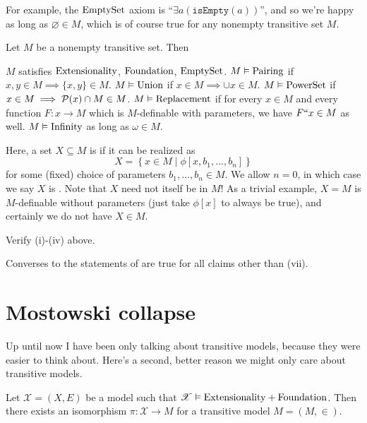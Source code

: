 For example, the $\mathrm{EmptySet}$ axiom is ``$\exists a (\mathtt{isEmpty}(a))$'',
and so we're happy as long as $\varnothing \in M$, which is of course
true for any nonempty transitive set $M$.

\begin{lemma}
	\label{lem:transitive_ZFC}
	Let $M$ be a nonempty transitive set. Then
	\begin{enumerate}[(i)]
		\ii $M$ satisfies $\mathrm{Extensionality}$, $\mathrm{Foundation}$, $\mathrm{EmptySet}$.
		\ii $M \vDash \mathrm{Pairing}$ if $x,y \in M \implies \{x,y\} \in M$.
		\ii $M \vDash \mathrm{Union}$ if $x \in M \implies \cup x \in M$.
		\ii $M \vDash \mathrm{PowerSet}$ if $x \in M \implies \mathcal P(x) \cap M \in M$.
		\ii $M \vDash \mathrm{Replacement}$ if for every $x \in M$
		and every function $F : x \to M$
		which is $M$-definable with parameters,
		we have $F``x \in M$ as well.
		\ii $M \vDash \mathrm{Infinity}$ as long as $\omega \in M$.
	\end{enumerate}
\end{lemma}
Here, a set $X \subseteq M$ is 
if it can be realized as
\[ X = \left\{ x \in M \mid \phi[x, b_1, \dots, b_n] \right\} \]
for some (fixed) choice of parameters $b_1,\dots,b_n \in M$.
We allow $n=0$, in which case we say $X$ is .
Note that $X$ need not itself be in $M$!
As a trivial example, $X = M$ is $M$-definable without parameters
(just take $\phi[x]$ to always be true), and certainly we do not have $X \in M$.
\begin{exercise}
	Verify (i)-(iv) above.
\end{exercise}
\begin{remark}
	Converses to the statements of 
	are true for all claims other than (vii).
\end{remark}

\section{Mostowski collapse}
Up until now I have been only talking about transitive models,
because they were easier to think about.
Here's a second, better reason we might only care about transitive models.

\begin{lemma}
	Let $\mathscr X = (X,E)$ be a model
	such that $\mathscr X \vDash \mathrm{Extensionality} + \mathrm{Foundation}$.
	Then there exists an isomorphism $\pi : \mathscr X \to M$ for
	a transitive model $M = (M,\in)$.
\end{lemma}

